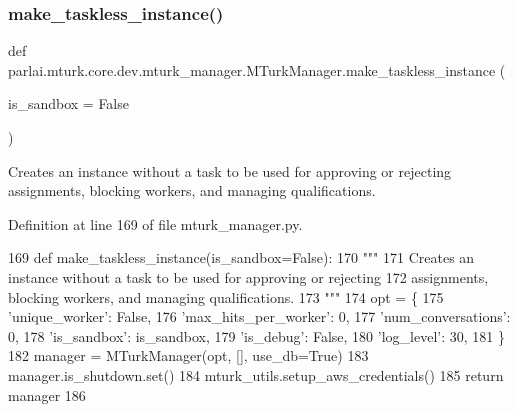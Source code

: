 \subsubsection{\texorpdfstring{make\+\_\+taskless\+\_\+instance()}{make\_taskless\_instance()}}
{\footnotesize\ttfamily def parlai.\+mturk.\+core.\+dev.\+mturk\+\_\+manager.\+M\+Turk\+Manager.\+make\+\_\+taskless\+\_\+instance (\begin{DoxyParamCaption}\item[{}]{is\+\_\+sandbox = {\ttfamily False} }\end{DoxyParamCaption})\hspace{0.3cm}{\ttfamily [static]}}

\begin{DoxyVerb}Creates an instance without a task to be used for approving or rejecting
assignments, blocking workers, and managing qualifications.
\end{DoxyVerb}
 

Definition at line 169 of file mturk\+\_\+manager.\+py.


\begin{DoxyCode}
169     \textcolor{keyword}{def }make\_taskless\_instance(is\_sandbox=False):
170         \textcolor{stringliteral}{"""}
171 \textcolor{stringliteral}{        Creates an instance without a task to be used for approving or rejecting}
172 \textcolor{stringliteral}{        assignments, blocking workers, and managing qualifications.}
173 \textcolor{stringliteral}{        """}
174         opt = \{
175             \textcolor{stringliteral}{'unique\_worker'}: \textcolor{keyword}{False},
176             \textcolor{stringliteral}{'max\_hits\_per\_worker'}: 0,
177             \textcolor{stringliteral}{'num\_conversations'}: 0,
178             \textcolor{stringliteral}{'is\_sandbox'}: is\_sandbox,
179             \textcolor{stringliteral}{'is\_debug'}: \textcolor{keyword}{False},
180             \textcolor{stringliteral}{'log\_level'}: 30,
181         \}
182         manager = MTurkManager(opt, [], use\_db=\textcolor{keyword}{True})
183         manager.is\_shutdown.set()
184         mturk\_utils.setup\_aws\_credentials()
185         \textcolor{keywordflow}{return} manager
186 
\end{DoxyCode}
\mbox{\label{classparlai_1_1mturk_1_1core_1_1dev_1_1mturk__manager_1_1MTurkManager_aeb9072df3104a5a3fbf3a5ecda89b41f}} 
